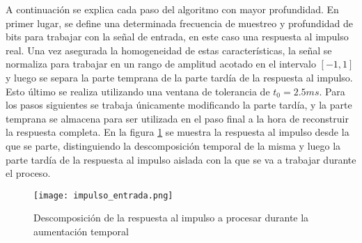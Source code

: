 A continuación se explica cada paso del algoritmo con mayor profundidad.
En primer lugar, se define una determinada frecuencia de muestreo y profundidad de bits para trabajar con la señal de entrada, en este caso una respuesta al impulso real. Una vez asegurada la homogeneidad de estas características, la señal se normaliza para trabajar en un rango de amplitud acotado en el intervalo $[-1,1]$ y luego se separa la parte temprana de la parte tardía de la respuesta al impulso. Esto último se realiza utilizando una ventana de tolerancia de $t_{0} = 2.5 ms$. Para los pasos siguientes se trabaja únicamente modificando la parte tardía, y la parte temprana se almacena para ser utilizada en el paso final a la hora de reconstruir la respuesta completa. En la figura \ref{fig:impulso_entrada} se  muestra la respuesta al impulso desde la que se parte, distinguiendo la descomposición temporal de la misma y luego la parte tardía de la respuesta al impulso aislada con la que se va a trabajar durante el proceso.

\begin{figure}[H]
	\centering{}
	\texttt{[image: impulso\_entrada.png]}
	\caption{Descomposición de la respuesta al impulso a procesar durante la aumentación temporal}
	\label{fig:impulso_entrada}
\end{figure}

